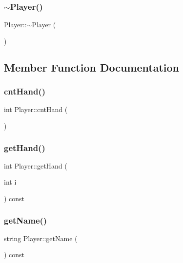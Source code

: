 \mbox{\label{class_player_a749d2c00e1fe0f5c2746f7505a58c062}} 
\subsubsection{\texorpdfstring{$\sim$\+Player()}{~Player()}}
{\footnotesize\ttfamily Player\+::$\sim$\+Player (\begin{DoxyParamCaption}{ }\end{DoxyParamCaption})}



\subsection{Member Function Documentation}
\mbox{\label{class_player_a7267ccfd35abdbedfc85935e968f2857}} 
\subsubsection{\texorpdfstring{cnt\+Hand()}{cntHand()}}
{\footnotesize\ttfamily int Player\+::cnt\+Hand (\begin{DoxyParamCaption}{ }\end{DoxyParamCaption})}

\mbox{\label{class_player_a47a59334ee6ddc63016a453b98f3da65}} 
\subsubsection{\texorpdfstring{get\+Hand()}{getHand()}}
{\footnotesize\ttfamily int Player\+::get\+Hand (\begin{DoxyParamCaption}\item[{int}]{i }\end{DoxyParamCaption}) const\hspace{0.3cm}{\ttfamily [inline]}}

\mbox{\label{class_player_a4939193fc637f75bf7a11118334dae7e}} 
\subsubsection{\texorpdfstring{get\+Name()}{getName()}}
{\footnotesize\ttfamily string Player\+::get\+Name (\begin{DoxyParamCaption}{ }\end{DoxyParamCaption}) const\hspace{0.3cm}{\ttfamily [inline]}}

